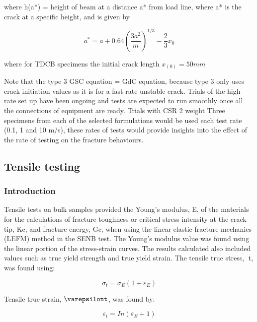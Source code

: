 \documentclass[numbers=noendperiod,chapterprefix=on]{icldt} %
\begin{document}
where h(a*) = height of beam at a distance a* from load line, where a* is the crack at a specific height, and is given by

\begin{equation} 
a^\ast=a+0.64 \left( \frac{3a^2}{m}\right) ^{1/3}-\frac{2}{3}x_0
\end{equation}

where for TDCB specimens the initial crack length $x_(0)= 50mm$ 

Note that the type 3 GSC equation = GdC equation, because type 3 only uses crack initiation values as it is for a fast-rate unstable crack. 
Trials of the high rate set up have been ongoing and tests are expected to run smoothly once all the connections of equipment are ready. Trials with CSR 2 weight %
Three specimens from each of the selected formulations would be used each test rate (0.1, 1 and 10 m/s), these rates of tests would provide insights into the effect of the rate of testing on the fracture behaviours.

\subsection{Tensile testing}
\subsubsection{Introduction}
Tensile tests on bulk samples provided the Young’s modulus, E, of the materials for the calculations of fracture toughness or critical stress intensity at the crack tip, Kc, and fracture energy, Gc, when using the linear elastic fracture mechanics (LEFM) method in the SENB test. The Young’s modulus value was found using the linear portion of the stress-strain curves. The results calculated also included values such as true yield strength and true yield strain. 
The tensile true stress, t, was found using: 

\begin{equation} 
\sigma_t= \sigma_E (1+\varepsilon_E)
\end{equation}

Tensile true strain, $\varepsilont$, was found by:

\begin{equation} 
\varepsilon_t=In(\varepsilon_E+1)
\end{equation}
\end{document}
